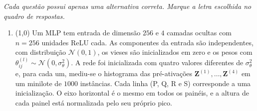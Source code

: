 \documentclass[11pt,a4paper]{article}
\begin{document}
\textit{Cada questão possui apenas uma alternativa correta. Marque a letra escolhida no quadro de respostas.}

\begin{enumerate}[1)]
\setlength{\itemsep}{1em}

\item (1{,}0) Um MLP tem entrada de dimensão $256$ e $4$ camadas ocultas com $n = 256$ unidades ReLU cada. As componentes da entrada são independentes, com distribuição $\mathcal{N}(0, 1)$, os vieses são inicializados em zero e os pesos com $\theta^{(l)}_{ij} \sim \mathcal{N}(0, \sigma_\theta^2)$. A rede foi inicializada com quatro valores diferentes de $\sigma_\theta^2$ e, para cada um, mediu-se o histograma das pré-ativações $\mathbf{Z}^{(1)}, \ldots, \mathbf{Z}^{(4)}$ em um minilote de $1000$ instâncias. Cada linha (P, Q, R e S) corresponde a uma inicialização. O eixo horizontal é o mesmo em todos os painéis, e a altura de cada painel está normalizada pelo seu próprio pico.


\end{enumerate}
\end{document}
